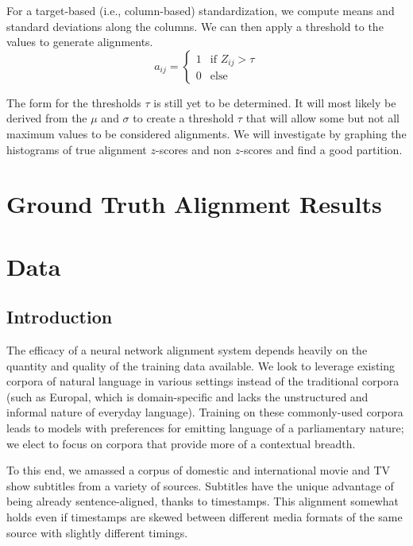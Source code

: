\documentclass[twoside,twocolumn]{article}
\begin{document}
For a target-based (i.e., column-based) standardization, we compute means and
standard deviations along the columns. We can then apply a threshold to the
values to generate alignments.
\begin{equation}
  a_{ij} = \begin{cases}
    1 & \text{if } Z_{ij} > \tau \\
    0 & \text{else}
  \end{cases}
\end{equation}

The form for the thresholds $\tau$ is still yet to be determined. It will most
likely be derived from the $\mu$ and $\sigma$ to create a threshold $\tau$ that
will allow some but not all maximum values to be considered alignments. We will
investigate by graphing the histograms of true alignment $z$-scores and non
$z$-scores and find a good partition. 

\section{Ground Truth Alignment Results}

\section{Data}



\subsection{Introduction}

The efficacy of a neural network alignment system depends heavily on the
quantity and quality of the training data available. We look to leverage
existing corpora of natural language in various settings instead of the
traditional corpora (such as Europal, which is domain-specific and lacks the
unstructured and informal nature of everyday language). Training on these
commonly-used corpora leads to models with preferences for emitting language
of a parliamentary nature; we elect to focus on corpora that
provide more of a contextual breadth.

To this end, we amassed a corpus of domestic and international movie and TV
show subtitles from a variety of sources. Subtitles have the unique advantage
of being already sentence-aligned, thanks to timestamps. This alignment
somewhat holds even if timestamps are skewed between different media
formats of the same source with slightly different timings.
\end{document}
